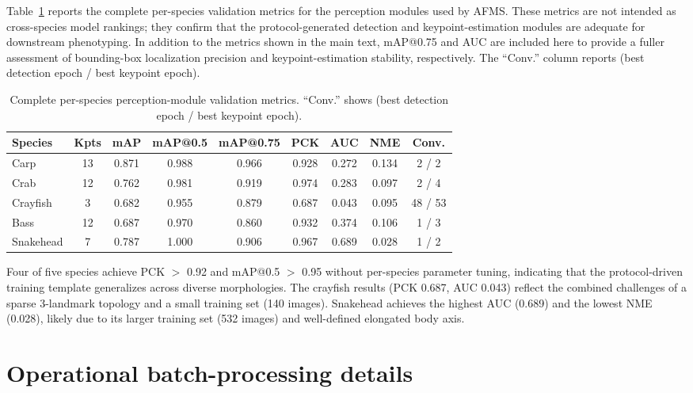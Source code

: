 \documentclass[9pt]{osa-supplemental-document}
\begin{document}
Table~\ref{tab:all_results} reports the complete per-species validation metrics for the perception modules used by AFMS. These metrics are not intended as cross-species model rankings; they confirm that the protocol-generated detection and keypoint-estimation modules are adequate for downstream phenotyping. In addition to the metrics shown in the main text, mAP@0.75 and AUC are included here to provide a fuller assessment of bounding-box localization precision and keypoint-estimation stability, respectively. The ``Conv.'' column reports (best detection epoch / best keypoint epoch).

\begin{table}[htbp]
\centering
\caption{Complete per-species perception-module validation metrics. ``Conv.'' shows (best detection epoch / best keypoint epoch).}
\label{tab:all_results}
\small
\begin{tabular}{lc ccccc cc}
\toprule
\textbf{Species} & \textbf{Kpts}
  & \textbf{mAP} & \textbf{mAP@0.5} & \textbf{mAP@0.75}
  & \textbf{PCK} & \textbf{AUC} & \textbf{NME} & \textbf{Conv.} \\
\midrule
Carp      & 13 & 0.871 & 0.988 & 0.966 & 0.928 & 0.272 & 0.134 & 2 / 2   \\
Crab      & 12 & 0.762 & 0.981 & 0.919 & 0.974 & 0.283 & 0.097 & 2 / 4   \\
Crayfish  &  3 & 0.682 & 0.955 & 0.879 & 0.687 & 0.043 & 0.095 & 48 / 53 \\
Bass      & 12 & 0.687 & 0.970 & 0.860 & 0.932 & 0.374 & 0.106 & 1 / 3   \\
Snakehead &  7 & 0.787 & 1.000 & 0.906 & 0.967 & 0.689 & 0.028 & 1 / 2   \\
\bottomrule
\end{tabular}
\end{table}

Four of five species achieve PCK $>$ 0.92 and mAP@0.5 $>$ 0.95 without per-species parameter tuning, indicating that the protocol-driven training template generalizes across diverse morphologies. The crayfish results (PCK 0.687, AUC 0.043) reflect the combined challenges of a sparse 3-landmark topology and a small training set (140 images). Snakehead achieves the highest AUC (0.689) and the lowest NME (0.028), likely due to its larger training set (532 images) and well-defined elongated body axis.

\section{Operational batch-processing details}
\label{sec:batch_details}
\end{document}

